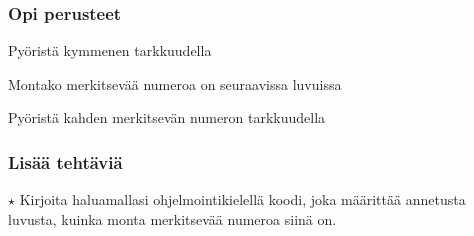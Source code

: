 \begin{tehtavasivu}
\subsubsection*{Opi perusteet}

\begin{tehtava}
Pyöristä kymmenen tarkkuudella
\begin{vastaus}
\end{vastaus}
\end{tehtava}

\begin{tehtava}
Montako merkitsevää numeroa on seuraavissa luvuissa
	\begin{vastaus}
	\end{vastaus}
\end{tehtava}

\begin{tehtava}
Pyöristä kahden merkitsevän numeron tarkkuudella
	\begin{vastaus}
	\end{vastaus}
\end{tehtava}


\subsubsection*{Lisää tehtäviä}

\begin{tehtava}
$\star$ Kirjoita haluamallasi ohjelmointikielellä koodi, joka määrittää annetusta luvusta, kuinka monta merkitsevää numeroa siinä on.
\end{tehtava}

\end{tehtavasivu}